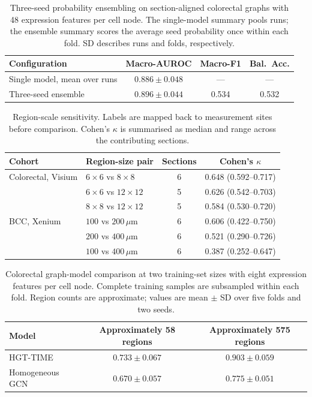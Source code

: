 \begin{table}[!ht]
\centering
\caption{Three-seed probability ensembling on section-aligned colorectal graphs with 48
expression features per cell node. The single-model summary pools runs; the ensemble summary
scores the average seed probability once within each fold. SD describes runs and folds,
respectively.}
\label{tab:ens}
\small
\begin{tabularx}{\linewidth}{@{}Xccc@{}}
\toprule
Configuration & Macro-AUROC & Macro-F1 & Bal.\ Acc. \\
\midrule
Single model, mean over runs & $0.886\pm0.048$ & --- & --- \\
Three-seed ensemble & $\mathbf{0.896\pm0.044}$ & 0.534 & 0.532 \\
\bottomrule
\end{tabularx}
\end{table}

\begin{table}[!ht]
\centering
\caption{Region-scale sensitivity. Labels are mapped back to measurement sites before
comparison. Cohen's $\kappa$ is summarised as median and range across the contributing sections.}
\label{tab:scale}
\small
\begin{tabularx}{\linewidth}{@{}Xlcc@{}}
\toprule
Cohort & Region-size pair & Sections & Cohen's $\kappa$ \\
\midrule
Colorectal, Visium & $6\times6$ vs $8\times8$ & 6 & 0.648 (0.592--0.717) \\
 & $6\times6$ vs $12\times12$ & 5 & 0.626 (0.542--0.703) \\
 & $8\times8$ vs $12\times12$ & 5 & 0.584 (0.530--0.720) \\
\midrule
BCC, Xenium & $100$ vs $200\,\mu$m & 6 & 0.606 (0.422--0.750) \\
 & $200$ vs $400\,\mu$m & 6 & 0.521 (0.290--0.726) \\
 & $100$ vs $400\,\mu$m & 6 & 0.387 (0.252--0.647) \\
\bottomrule
\end{tabularx}
\end{table}

\begin{table}[!ht]
\centering
\caption{Colorectal graph-model comparison at two training-set sizes with eight expression
features per cell node. Complete training samples are subsampled within each fold. Region
counts are approximate; values are mean $\pm$ SD over five folds and two seeds.}
\label{tab:labels}
\small
\begin{tabularx}{\linewidth}{@{}Xcc@{}}
\toprule
Model & Approximately 58 regions & Approximately 575 regions \\
\midrule
HGT-TIME & $\mathbf{0.733\pm0.067}$ & $\mathbf{0.903\pm0.059}$ \\
Homogeneous GCN & $0.670\pm0.057$ & $0.775\pm0.051$ \\
\bottomrule
\end{tabularx}
\end{table}

